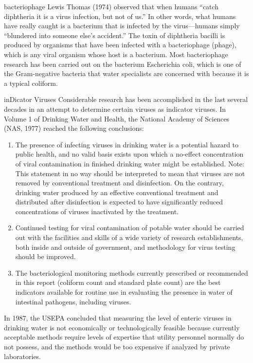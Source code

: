 \documentclass{article}
\begin{document}
bacteriophage Lewis Thomas (1974) observed that when humans ``catch
diphtheria it is a virus infection, but not of us.'' In other words,
what humans have really caught is a bacterium that is infected by the
virus---humans simply ``blundered into someone else's accident.'' The
toxin of diphtheria bacilli is produced by organisms that have been
infected with a bacteriophage (phage), which is any viral organism whose
host is a bacterium. Most bacteriophage research has been carried out on
the bacterium Escherichia coli, which is one of the Gram-negative
bacteria that water specialists are concerned with because it is a
typical coliform.

inDicator Viruses Considerable research has been accomplished in the
last several decades in an attempt to determine certain viruses as
indicator viruses. In Volume 1 of Drinking Water and Health, the
National Academy of Sciences (NAS, 1977) reached the following
conclusions:

\begin{enumerate}
\def\labelenumi{\arabic{enumi}.}
\tightlist
\item
  The presence of infecting viruses in drinking water is a potential
  hazard to public health, and no valid basis exists upon which a
  no-effect concentration of viral contamination in finished drinking
  water might be established. Note: This statement in no way should be
  interpreted to mean that viruses are not removed by conventional
  treatment and disinfection. On the contrary, drinking water produced
  by an effective conventional treatment and distributed after
  disinfection is expected to have significantly reduced concentrations
  of viruses inactivated by the treatment.
\item
  Continued testing for viral contamination of potable water should be
  carried out with the facilities and skills of a wide variety of
  research establishments, both inside and outside of government, and
  methodology for virus testing should be improved.
\item
  The bacteriological monitoring methods currently prescribed or
  recommended in this report (coliform count and standard plate count)
  are the best indicators available for routine use in evaluating the
  presence in water of intestinal pathogens, including viruses.
\end{enumerate}

In 1987, the USEPA concluded that measuring the level of enteric viruses
in drinking water is not economically or technologically feasible
because currently acceptable methods require levels of expertise that
utility personnel normally do not possess, and the methods would be too
expensive if analyzed by private laboratories.
\end{document}
